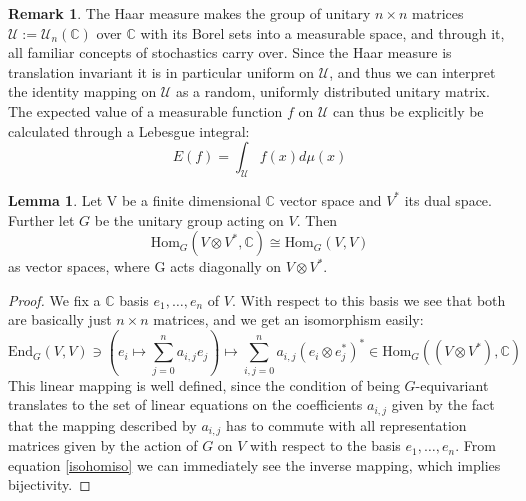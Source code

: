 \documentclass{article}
\def\C{\mathbb{C}}
\def\U{\mathcal{U}}
\def\End{\text{End}}
\def\Hom{\text{Hom}}
\def\fa{\text{ for all }}
\theoremstyle{definition}
\newtheorem{rem}[Satz]{Remark}
\newtheorem{lem}[Satz]{Lemma}
\begin{document}
\begin{rem}
The Haar measure makes the group of unitary $n \times n$ matrices $\U:=\U_n(\C)$ over $\C$ with its Borel sets into a measurable space, and through it, all familiar concepts of stochastics carry over.
Since the Haar measure is translation invariant it is in particular uniform on $\U$, and thus we can interpret the identity mapping on $\U$ as a random, uniformly distributed unitary matrix.
The expected value of a measurable function $f$ on $\U$ can thus be explicitly be calculated through a Lebesgue integral: 
\begin{equation}
E(f) = \int_{\U} f(x) d\mu(x)
\end{equation}
\end{rem}

\begin{lem}\label{homiso}
Let V be a finite dimensional $\C$ vector space and $V^*$ its dual space. Further let $G$ be the unitary group acting on $V$. Then \begin{equation} \Hom_{G}(V \otimes V^*, \C) \cong \Hom_{G}(V,V) \end{equation} as vector spaces, where G acts diagonally on $V \otimes V^*$.
\begin{proof}
We fix a $\C$ basis $e_1, \ldots, e_n$ of $V$. With respect to this basis we see that both are basically just $n \times n$ matrices, and we get an isomorphism easily: 
\begin{equation}\label{isohomiso} \End_G(V,V) \ni (e_i \mapsto \sum_{j=0}^n a_{i,j}e_j) \mapsto \sum_{i,j=0}^n a_{i,j} (e_i \otimes e^*_j)^* \in \Hom_G((V \otimes V^*),\C) \end{equation}
This linear mapping is well defined, since the condition of being $G$-equivariant translates to the set of linear equations on the coefficients $a_{i,j}$ given by the fact that the mapping described by $a_{i,j}$ has to commute with all
representation matrices given by the action of $G$ on $V$ with respect to the basis $e_1, \ldots, e_n$. From equation \ref{isohomiso} we can immediately see the inverse mapping, which implies bijectivity.
\end{proof}
\end{lem}
\end{document}
